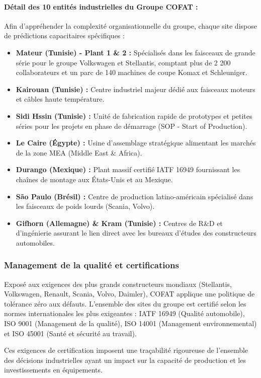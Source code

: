 \paragraph{Détail des 10 entités industrielles du Groupe COFAT :}
Afin d'appréhender la complexité organisationnelle du groupe, chaque site dispose de prédictions capacitaires spécifiques :
\begin{itemize}
    \item \textbf{Mateur (Tunisie) - Plant 1 \& 2 :} Spécialisés dans les faisceaux de grande série pour le groupe Volkswagen et Stellantis, comptant plus de 2 200 collaborateurs et un parc de 140 machines de coupe Komax et Schleuniger.
    \item \textbf{Kairouan (Tunisie) :} Centre industriel majeur dédié aux faisceaux moteurs et câbles haute température.
    \item \textbf{Sidi Hssin (Tunisie) :} Unité de fabrication rapide de prototypes et petites séries pour les projets en phase de démarrage (SOP - Start of Production).
    \item \textbf{Le Caire (Égypte) :} Usine d'assemblage stratégique alimentant les marchés de la zone MEA (Middle East \& Africa).
    \item \textbf{Durango (Mexique) :} Plant massif certifié IATF 16949 fournissant les chaînes de montage aux États-Unis et au Mexique.
    \item \textbf{São Paulo (Brésil) :} Centre de production latino-américain spécialisé dans les faisceaux de poids lourds (Scania, Volvo).
    \item \textbf{Gifhorn (Allemagne) \& Kram (Tunisie) :} Centres de R\&D et d'ingénierie assurant le lien direct avec les bureaux d'études des constructeurs automobiles.
\end{itemize}

\subsubsection{Management de la qualité et certifications}
Exposé aux exigences des plus grands constructeurs mondiaux (Stellantis, Volkswagen, Renault, Scania, Volvo, Daimler), COFAT applique une politique de tolérance zéro aux défauts. L'ensemble des sites du groupe est certifié selon les normes internationales les plus exigeantes : IATF 16949 (Qualité automobile), ISO 9001 (Management de la qualité), ISO 14001 (Management environnemental) et ISO 45001 (Santé et sécurité au travail).

Ces exigences de certification imposent une traçabilité rigoureuse de l'ensemble des décisions industrielles ayant un impact sur la capacité de production et les investissements en équipements.

